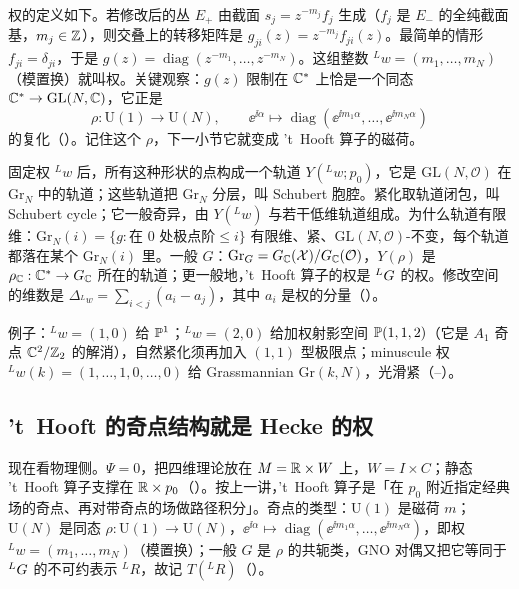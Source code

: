 权的定义如下。若修改后的丛 $E_+$ 由截面 $s_j=z^{-m_j}f_j$ 生成（$f_j$ 是 $E_-$ 的全纯截面基，$m_j\in\mathbb{Z}$），则交叠上的转移矩阵是 $g_{ji}(z)=z^{-m_j}f_{ji}(z)$。最简单的情形 $f_{ji}=\delta_{ji}$，于是 $g(z)=\operatorname{diag}(z^{-m_1},\dots,z^{-m_N})$。这组整数 ${}^{L}w=(m_1,\dots,m_N)$（模置换）就叫权。关键观察：$g(z)$ 限制在 $\mathbb{C}^*$ 上恰是一个同态 $\mathbb{C}^*\to\mathrm{GL}(N,\mathbb{C})$，它正是
\begin{equation}
\rho:\mathrm{U}(1)\to\mathrm{U}(N),\qquad \ee^{\ii\alpha}\mapsto\operatorname{diag}(\ee^{\ii m_1\alpha},\dots,\ee^{\ii m_N\alpha})
\label{eq:rho}
\end{equation}
的复化（）。记住这个 $\rho$，下一小节它就变成 't~Hooft 算子的磁荷。

固定权 ${}^{L}w$ 后，所有这种形状的点构成一个轨道 $Y({}^{L}w;p_0)$，它是 $\mathrm{GL}(N,\mathcal O)$ 在 $\mathrm{Gr}_N$ 中的轨道；这些轨道把 $\mathrm{Gr}_N$ 分层，叫 Schubert 胞腔。紧化取轨道闭包，叫 Schubert cycle；它一般奇异，由 $Y({}^{L}w)$ 与若干低维轨道组成。为什么轨道有限维：$\mathrm{Gr}_N(i)=\{g:\text{在 }0\text{ 处极点阶}\le i\}$ 有限维、紧、$\mathrm{GL}(N,\mathcal O)$-不变，每个轨道都落在某个 $\mathrm{Gr}_N(i)$ 里。一般 $G$：$\mathrm{Gr}_G=G_{\mathbb{C}}(\mathcal X)/G_{\mathbb{C}}(\mathcal O)$，$Y(\rho)$ 是 $\rho_{\mathbb{C}}:\mathbb{C}^*\to G_{\mathbb{C}}$ 所在的轨道；更一般地，'t~Hooft 算子的权是 ${}^{L}G$ 的权。修改空间的维数是 $\Delta_{{}^{L}w}=\sum_{i<j}(a_i-a_j)$，其中 $a_i$ 是权的分量（）。

例子：${}^{L}w=(1,0)$ 给 $\mathbb{P}^1$；${}^{L}w=(2,0)$ 给加权射影空间 $\mathbb{P}(1,1,2)$（它是 $A_1$ 奇点 $\mathbb{C}^2/\mathbb{Z}_2$ 的解消），自然紧化须再加入 $(1,1)$ 型极限点；minuscule 权 ${}^{L}w(k)=(1,\dots,1,0,\dots,0)$ 给 Grassmannian $\mathrm{Gr}(k,N)$，光滑紧（--）。

\subsection{'t~Hooft 的奇点结构就是 Hecke 的权}

现在看物理侧。$\Psi=0$，把四维理论放在 $M=\mathbb{R}\times W$ 上，$W=I\times C$；静态 't~Hooft 算子支撑在 $\mathbb{R}\times p_0$（）。按上一讲，'t~Hooft 算子是「在 $p_0$ 附近指定经典场的奇点、再对带奇点的场做路径积分」。奇点的类型：$\mathrm{U}(1)$ 是磁荷 $m$；$\mathrm{U}(N)$ 是同态 $\rho:\mathrm{U}(1)\to\mathrm{U}(N)$，$\ee^{\ii\alpha}\mapsto\operatorname{diag}(\ee^{\ii m_1\alpha},\dots,\ee^{\ii m_N\alpha})$，即权 ${}^{L}w=(m_1,\dots,m_N)$（模置换）；一般 $G$ 是 $\rho$ 的共轭类，GNO 对偶又把它等同于 ${}^{L}G$ 的不可约表示 ${}^{L}R$，故记 $T({}^{L}R)$（）。


